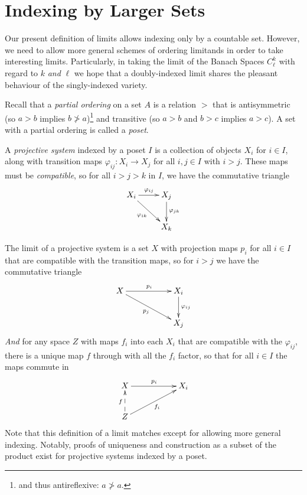     \section{Indexing by Larger Sets}
      Our present definition of limits allows indexing only by a countable set.
      However, we need to allow more general schemes of ordering limitands in order to take interesting limits.
      Particularly, in taking the limit of the Banach Spaces $C^k_\ell$ with regard to $k$ \emph{and} $\ell$ we hope that a doubly-indexed limit shares the pleasant behaviour of the singly-indexed variety.
      
      Recall that a \emph{partial ordering} on a set $A$ is a relation $>$ that is antisymmetric (so $a>b$ implies $b\not>a$)\footnote{and thus antireflexive: $a\not>a$.} and transitive (so $a>b$ and $b>c$ implies $a>c$).
      A set with a partial ordering is called a \emph{poset}.

      A \emph{projective system} indexed by a poset $I$ is a collection of objects $X_i$ for $i\in I$, along with transition maps $\varphi_{ij}:X_i\rightarrow X_j$ for all $i,j\in I$ with $i>j$.
      These maps must be \emph{compatible}, so for all $i>j>k$ in $I$, we have the commutative triangle
      \begin{displaymath}
        \xymatrix{
          X_i \ar[r]^{\varphi_{ij}} \ar[dr]_{\varphi_{ik}} & X_j \ar[d]^{\varphi_{jk}} \\
          & X_k
        }
      \end{displaymath}

      The limit of a projective system is a set $X$ with projection maps $p_i$ for all $i\in I$ that are compatible with the transition maps, so for $i>j$ we have the commutative triangle
      \begin{displaymath}
        \xymatrix{
          X \ar[rr]^{p_i} \ar[drr]_{p_j} && X_i \ar[d]^{\varphi_{ij}} \\
          && X_j
        }
      \end{displaymath}
      \emph{And} for any space $Z$ with maps $f_i$ into each $X_i$ that are compatible with the $\varphi_{ij}$, there is a unique map $f$ through with all the $f_i$ factor, so that for all $i\in I$ the maps commute in
      \begin{displaymath}
        \xymatrix{
          X \ar[rr]^{p_i} && X_i  \\
          Z \ar@{-->}[u]^f \ar[urr]_{f_i} 
        }
      \end{displaymath}
      Note that this definition of a limit matches  except for allowing more general indexing.
      Notably, proofs of uniqueness and construction as a subset of the product exist for projective systems indexed by a poset.
      
